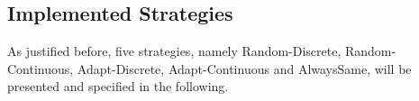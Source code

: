 \documentclass[11pt]{article}
\begin{document}
%
%

\subsection{Implemented Strategies}

As justified before, five strategies, namely Random-Discrete, Random-Continuous, Adapt-Discrete, Adapt-Continuous and AlwaysSame, will be presented and specified in the following.
	
\end{document}
